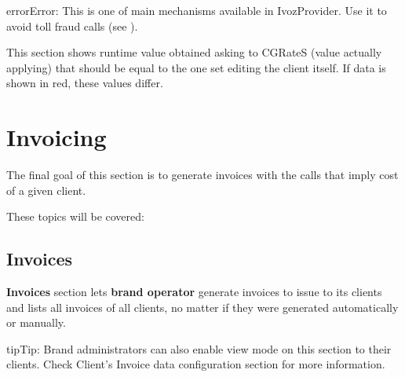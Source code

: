 \documentclass[letterpaper,10pt,english]{sphinxmanual}
\begin{document}
\begin{notice}{error}{Error:}
This is one of main {\hyperref[security_and_maintenance/security/index:security]{}} mechanisms available in IvozProvider. Use it to avoid toll fraud calls
(see {\hyperref[security_and_maintenance/security/current_day_max_usage:current\string-day\string-max\string-usage]{}}).
\end{notice}

This section shows runtime value obtained asking to CGRateS (value actually applying) that should be equal to the one
set editing the client itself. If data is shown in red, these values differ.


\section{Invoicing}
\label{administration_portal/brand/invoicing/index::doc}\label{administration_portal/brand/invoicing/index:invoicing}
The final goal of this section is to generate invoices with the calls that imply
cost of a given client.

These topics will be covered:


\subsection{Invoices}
\label{administration_portal/brand/invoicing/invoices:invoices}\label{administration_portal/brand/invoicing/invoices::doc}\label{administration_portal/brand/invoicing/invoices:id1}
\textbf{Invoices} section lets \textbf{brand operator} generate invoices to issue to its clients and lists all invoices of all
clients, no matter if they were generated automatically or manually.

\begin{notice}{tip}{Tip:}
Brand administrators can also enable view mode on this section to their clients. Check Client's Invoice data
configuration section for more information.
\end{notice}
\end{document}
